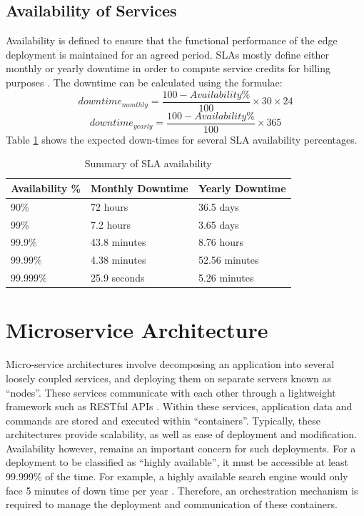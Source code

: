 \subsection{Availability of Services}
\label{subsec:svc-availability}
Availability is defined to ensure that the functional performance of the edge deployment is maintained for an agreed period. SLAs mostly define either monthly or yearly downtime in order to compute service credits for billing purposes \cite{mirobi2015service}. The downtime can be calculated using the formulae:
\[ downtime_{monthly} = \frac{100 - Availability\%}{100} \times 30 \times 24 \]
\[ downtime_{yearly} = \frac{100 - Availability\%}{100} \times 365 \]
Table \ref{table:sla-availability} shows the expected down-times for several SLA availability percentages.

\begin{table}
    \caption{Summary of SLA availability}\label{table:sla-availability}
    \centering
    \begin{tabular}{|l|l|l|}
        \hline
        Availability \% & Monthly Downtime & Yearly Downtime\\
        \hline
        90\% & 72 hours & 36.5 days\\
        99\% & 7.2 hours & 3.65 days\\
        99.9\% & 43.8 minutes & 8.76 hours\\
        99.99\% & 4.38 minutes & 52.56 minutes\\
        99.999\% & 25.9 seconds & 5.26 minutes\\
        \hline
    \end{tabular}
\end{table}

\section{Microservice Architecture}
\label{sec:micro-svc-arc}

Micro-service architectures involve decomposing an application into several loosely coupled services, and deploying them on separate servers known as ``nodes''. These services communicate with each other through a lightweight framework such as RESTful APIs \cite{li2021understanding}. Within these services, application data and commands are stored and executed within ``containers''. Typically, these architectures provide scalability, as well as ease of deployment and modification. Availability however, remains an important concern for such deployments. For a deployment to be classified as ``highly available'', it must be accessible at least 99.999\% of the time. For example, a highly available search engine would only face 5 minutes of down time per year \cite{nabi2016availability}. Therefore, an orchestration mechanism is required to manage the deployment and communication of these containers.\par


